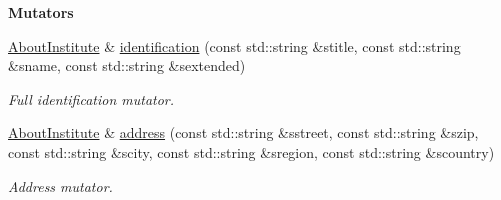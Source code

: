 \begin{Indent}{\bf Mutators}\par
\begin{DoxyCompactItemize}
\item 
\hyperlink{exceptionmagrathea_1_1AboutInstitute}{About\-Institute} \& \hyperlink{exceptionmagrathea_1_1AboutInstitute_ae79f727c26fb605e27723ddd0130bae4}{identification} (const std\-::string \&stitle, const std\-::string \&sname, const std\-::string \&sextended)
\begin{DoxyCompactList}\small\item\em Full identification mutator. \end{DoxyCompactList}\item 
\hyperlink{exceptionmagrathea_1_1AboutInstitute}{About\-Institute} \& \hyperlink{exceptionmagrathea_1_1AboutInstitute_a503e1ad15c94557216fb63ae39ac744e}{address} (const std\-::string \&sstreet, const std\-::string \&szip, const std\-::string \&scity, const std\-::string \&sregion, const std\-::string \&scountry)
\begin{DoxyCompactList}\small\item\em Address mutator. \end{DoxyCompactList}\end{DoxyCompactItemize}
\end{Indent}
